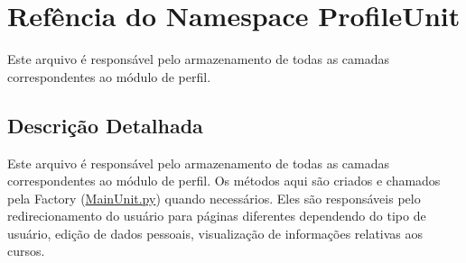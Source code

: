 \hypertarget{namespaceProfileUnit}{\section{Refência do Namespace Profile\-Unit}
\label{namespaceProfileUnit}
}


Este arquivo é responsável pelo armazenamento de todas as camadas correspondentes ao módulo de perfil.  




\subsection{Descrição Detalhada}
Este arquivo é responsável pelo armazenamento de todas as camadas correspondentes ao módulo de perfil. Os métodos aqui são criados e chamados pela Factory (\hyperlink{MainUnit_8py}{Main\-Unit.\-py}) quando necessários. Eles são responsáveis pelo redirecionamento do usuário para páginas diferentes dependendo do tipo de usuário, edição de dados pessoais, visualização de informações relativas aos cursos. 